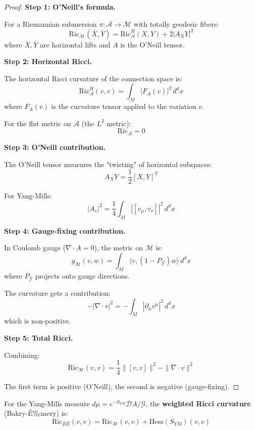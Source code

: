 \begin{proof}
\textbf{Step 1: O'Neill's formula.}

For a Riemannian submersion $\pi: \mathcal{A} \to \mathcal{M}$ with totally geodesic fibers:
\[
\mathrm{Ric}_\mathcal{M}(\bar{X}, \bar{Y}) = \mathrm{Ric}_\mathcal{A}^H(X, Y) + 2|A_X Y|^2
\]
where $\bar{X}, \bar{Y}$ are horizontal lifts and $A$ is the O'Neill tensor.

\textbf{Step 2: Horizontal Ricci.}

The horizontal Ricci curvature of the connection space is:
\[
\mathrm{Ric}_\mathcal{A}^H(v, v) = \int_M |F_A(v)|^2 \, d^dx
\]
where $F_A(v)$ is the curvature tensor applied to the variation $v$.

For the flat metric on $\mathcal{A}$ (the $L^2$ metric):
\[
\mathrm{Ric}_\mathcal{A} = 0
\]

\textbf{Step 3: O'Neill contribution.}

The O'Neill tensor measures the "twisting" of horizontal subspaces:
\[
A_X Y = \frac{1}{2} [X, Y]^V
\]

For Yang-Mills:
\[
|A_v|^2 = \frac{1}{4} \int_M |[v_\mu, v_\nu]|^2 \, d^dx
\]

\textbf{Step 4: Gauge-fixing contribution.}

In Coulomb gauge ($\nabla \cdot A = 0$), the metric on $\mathcal{M}$ is:
\[
g_\mathcal{M}(v, w) = \int_M \langle v, (1 - P_\mathcal{G}) w \rangle \, d^dx
\]
where $P_\mathcal{G}$ projects onto gauge directions.

The curvature gets a contribution:
\[
-|\nabla \cdot v|^2 = -\int_M |\partial_\mu v^\mu|^2 \, d^dx
\]
which is non-positive.

\textbf{Step 5: Total Ricci.}

Combining:
\[
\mathrm{Ric}_\mathcal{M}(v, v) = \frac{1}{4}\|[v, v]\|^2 - \|\nabla \cdot v\|^2
\]

The first term is positive (O'Neill), the second is negative (gauge-fixing).
\end{proof}

\begin{theorem}
\label{thm:positive-ricci-ym}
For the Yang-Mills measure $d\mu = e^{-S_{YM}} \mathcal{D}A / \mathcal{G}$, the 
\textbf{weighted Ricci curvature} (Bakry-\'E‰mery) is:
\[
\mathrm{Ric}_{BE}(v, v) = \mathrm{Ric}_\mathcal{M}(v, v) + \mathrm{Hess}(S_{YM})(v, v)
\]
\end{theorem}

